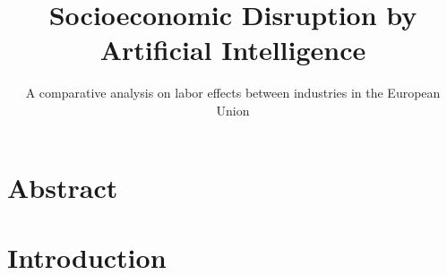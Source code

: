 \documentclass[
  12pt,
  a4paperpaper,
]{article}
\title{Socioeconomic Disruption by Artificial Intelligence}
\subtitle{A comparative analysis on labor effects between industries in
the European Union}
\author{}
\date{}
\begin{document}
\maketitle
{}

\newpage{}

\tableofcontents

\newpage{}

\listoffigures

\newpage{}

\listoftables

\newpage{}


\section{Abstract}\label{abstract}

\section{Introduction}\label{sec-introduction}
\end{document}
